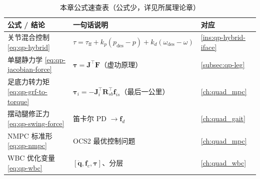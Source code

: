 \begin{table}[H]\centering\small
\caption{本章公式速查表（公式少，详见所属理论章）}
\begin{tabular}{lll}
\toprule
公式 / 结论 & 一句话说明 & 对应 \\
\midrule
关节混合控制 \cref{eq:qp-hybrid} & $\tau=\tau_{\mathrm{ff}}+k_p(p_{\mathrm{des}}-p)+k_d(\omega_{\mathrm{des}}-\omega)$ & \cref{ins:qp-hybrid-iface} \\
单腿静力学 \cref{eq:qp-jacobian-force} & $\boldsymbol{\tau}=\mathbf{J}^\top\boldsymbol{F}$（虚功原理）& \cref{subsec:qp-leg} \\
足底力转力矩 \cref{eq:qp-grf-to-torque} & $\boldsymbol{\tau}_i=-\mathbf{J}_i^\top\mathbf{R}_{sb}^\top\boldsymbol{f}_{is}$（最后一公里）& \cref{ch:quad_mpc} \\
摆动腿修正力 \cref{eq:qp-swing-force} & 笛卡尔 PD $\to\boldsymbol{f}_d$ & \cref{ch:quad_gait} \\
NMPC 标准形 \cref{eq:qp-nmpc} & OCS2 最优控制问题 & \cref{ch:quad_mpc} \\
WBC 优化变量 \cref{eq:qp-wbc} & $[\ddot{\boldsymbol{q}},\boldsymbol{f}_c,\boldsymbol{\tau}]$、分层 & \cref{ch:quad_wbc} \\
\bottomrule
\end{tabular}
\end{table}

